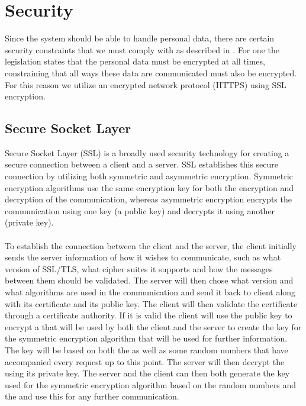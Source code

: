 \section{Security}


Since the system should be able to handle personal data, there are certain security constraints that we must comply with as described in . For one the legislation states that the personal data must be encrypted at all times, constraining that all ways these data are communicated must also be encrypted. For this reason we utilize an encrypted network protocol (HTTPS) using SSL encryption.

\subsection{Secure Socket Layer}
\label{sub:secure_socket_layer}
Secure Socket Layer (SSL) is a broadly used security technology for creating a secure connection between a client and a server. SSL establishes this secure connection by utilizing both symmetric and asymmetric encryption. Symmetric encryption algorithms use the same encryption key for both the encryption and decryption of the communication, whereas asymmetric encryption encrypts the communication using one key (a public key) and decrypts it using another (private key). 
\\\\
To establish the connection between the client and the server, the client initially sends the server information of how it wishes to communicate, such as what version of SSL/TLS, what cipher suites it supports and how the messages between them should be validated. The server will then chose what version and what algorithms are used in the communication and send it back to client along with its certificate and its public key. The client will then validate the certificate through a certificate authority. If it is valid the client will use the public key to encrypt a  that will be used by both the client and the server to create the key for the symmetric encryption algorithm that will be used for further information. The key will be based on both the  as well as some random numbers that have accompanied every request up to this point. The server will then decrypt the  using its private key. The server and the client can then both generate the key used for the symmetric encryption algorithm based on the random numbers and the  and use this for any further communication. 
\\\\




